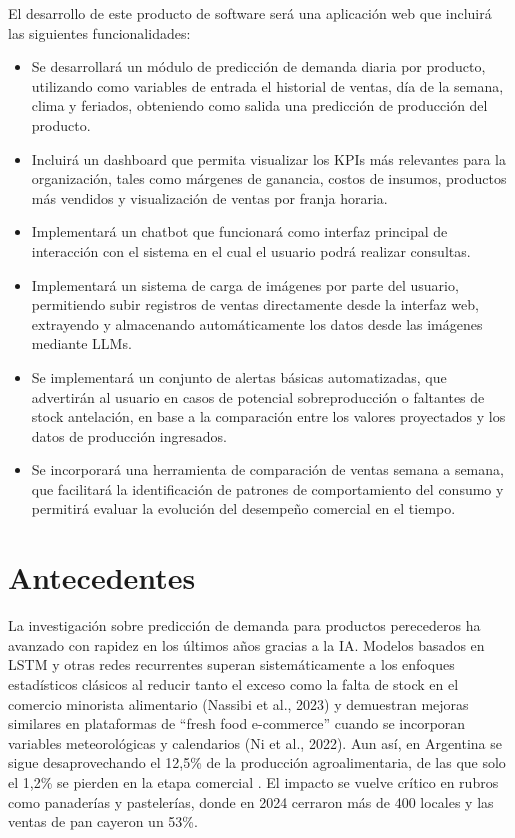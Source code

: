 El desarrollo de este producto de software será una aplicación web que incluirá las siguientes funcionalidades:

\begin{itemize}
    \item Se desarrollará un módulo de predicción de demanda diaria por producto, utilizando como variables de entrada el historial de ventas, día de la semana, clima y feriados, obteniendo como salida una predicción de producción del producto. 
    \item Incluirá un dashboard que permita visualizar los KPIs más relevantes para la organización, tales como márgenes de ganancia, costos de insumos, productos más vendidos y visualización de ventas por franja horaria. 
    \item Implementará un chatbot que funcionará como interfaz principal de interacción con el sistema en el cual el usuario podrá realizar consultas.
    \item Implementará un sistema de carga de imágenes por parte del usuario, permitiendo subir registros de ventas directamente desde la interfaz web, extrayendo y almacenando automáticamente los datos desde las imágenes mediante LLMs.
    \item Se implementará un conjunto de alertas básicas automatizadas, que advertirán al usuario en casos de potencial sobreproducción o faltantes de stock antelación, en base a la comparación entre los valores proyectados y los datos de producción ingresados. 
    \item Se incorporará una herramienta de comparación de ventas semana a semana, que facilitará la identificación de patrones de comportamiento del consumo y permitirá evaluar la evolución del desempeño comercial en el tiempo.
\end{itemize}

\section{Antecedentes}

La investigación sobre predicción de demanda para productos perecederos ha avanzado con rapidez en los últimos años gracias a la IA. Modelos basados en LSTM y otras redes recurrentes superan sistemáticamente a los enfoques estadísticos clásicos al reducir tanto el exceso como la falta de stock en el comercio minorista alimentario (Nassibi et al., 2023) y demuestran mejoras similares en plataformas de “fresh food e-commerce” cuando se incorporan variables meteorológicas y calendarios (Ni et al., 2022). Aun así, en Argentina se sigue desaprovechando el 12,5\% de la producción agroalimentaria, de las que solo el 1,2\% se pierden en la etapa comercial . El impacto se vuelve crítico en rubros como panaderías y pastelerías, donde en 2024 cerraron más de 400 locales y las ventas de pan cayeron un 53\%.


